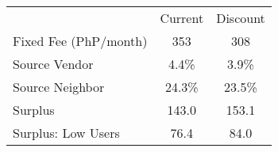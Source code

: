 \begin{tabular}{lcc}
& Current &  Discount \\
Fixed Fee (PhP/month) &353&308\\
Source Vendor &4.4\% &3.9\% \\
Source Neighbor &24.3\% &23.5\% \\
 Surplus  &143.0&153.1 \\
 Surplus: Low Users  &76.4&84.0 \\
\end{tabular}
